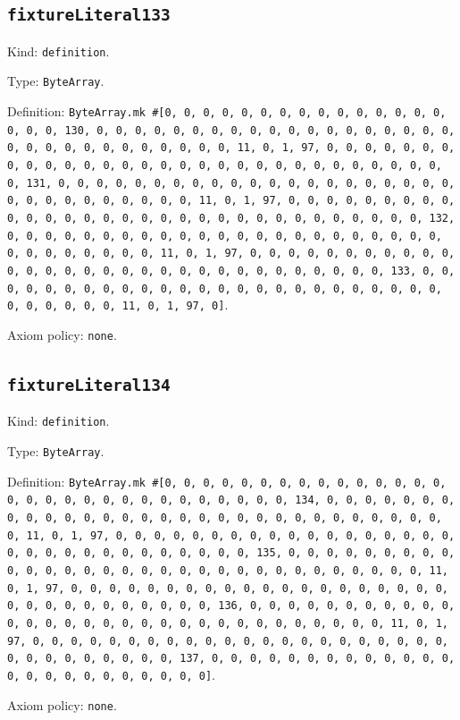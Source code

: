 \documentclass[11pt]{article}
\begin{document}
\subsection*{\texttt{fixtureLiteral133}}
\noindent Kind: \texttt{definition}.\par
\noindent Type: \texttt{ByteArray}.\par
\noindent Definition: \texttt{ByteArray.mk \#[0, 0, 0, 0, 0, 0, 0, 0, 0, 0, 0, 0, 0, 0, 0, 0, 0, 0, 130, 0, 0, 0, 0, 0, 0, 0, 0, 0, 0, 0, 0, 0, 0, 0, 0, 0, 0, 0, 0, 0, 0, 0, 0, 0, 0, 0, 0, 0, 0, 0, 11, 0, 1, 97, 0, 0, 0, 0, 0, 0, 0, 0, 0, 0, 0, 0, 0, 0, 0, 0, 0, 0, 0, 0, 0, 0, 0, 0, 0, 0, 0, 0, 0, 0, 0, 131, 0, 0, 0, 0, 0, 0, 0, 0, 0, 0, 0, 0, 0, 0, 0, 0, 0, 0, 0, 0, 0, 0, 0, 0, 0, 0, 0, 0, 0, 0, 0, 11, 0, 1, 97, 0, 0, 0, 0, 0, 0, 0, 0, 0, 0, 0, 0, 0, 0, 0, 0, 0, 0, 0, 0, 0, 0, 0, 0, 0, 0, 0, 0, 0, 0, 0, 132, 0, 0, 0, 0, 0, 0, 0, 0, 0, 0, 0, 0, 0, 0, 0, 0, 0, 0, 0, 0, 0, 0, 0, 0, 0, 0, 0, 0, 0, 0, 0, 11, 0, 1, 97, 0, 0, 0, 0, 0, 0, 0, 0, 0, 0, 0, 0, 0, 0, 0, 0, 0, 0, 0, 0, 0, 0, 0, 0, 0, 0, 0, 0, 0, 0, 0, 133, 0, 0, 0, 0, 0, 0, 0, 0, 0, 0, 0, 0, 0, 0, 0, 0, 0, 0, 0, 0, 0, 0, 0, 0, 0, 0, 0, 0, 0, 0, 0, 11, 0, 1, 97, 0]}.\par
\noindent Axiom policy: \texttt{none}.\par
\subsection*{\texttt{fixtureLiteral134}}
\noindent Kind: \texttt{definition}.\par
\noindent Type: \texttt{ByteArray}.\par
\noindent Definition: \texttt{ByteArray.mk \#[0, 0, 0, 0, 0, 0, 0, 0, 0, 0, 0, 0, 0, 0, 0, 0, 0, 0, 0, 0, 0, 0, 0, 0, 0, 0, 0, 0, 0, 0, 134, 0, 0, 0, 0, 0, 0, 0, 0, 0, 0, 0, 0, 0, 0, 0, 0, 0, 0, 0, 0, 0, 0, 0, 0, 0, 0, 0, 0, 0, 0, 0, 11, 0, 1, 97, 0, 0, 0, 0, 0, 0, 0, 0, 0, 0, 0, 0, 0, 0, 0, 0, 0, 0, 0, 0, 0, 0, 0, 0, 0, 0, 0, 0, 0, 0, 0, 135, 0, 0, 0, 0, 0, 0, 0, 0, 0, 0, 0, 0, 0, 0, 0, 0, 0, 0, 0, 0, 0, 0, 0, 0, 0, 0, 0, 0, 0, 0, 0, 11, 0, 1, 97, 0, 0, 0, 0, 0, 0, 0, 0, 0, 0, 0, 0, 0, 0, 0, 0, 0, 0, 0, 0, 0, 0, 0, 0, 0, 0, 0, 0, 0, 0, 0, 136, 0, 0, 0, 0, 0, 0, 0, 0, 0, 0, 0, 0, 0, 0, 0, 0, 0, 0, 0, 0, 0, 0, 0, 0, 0, 0, 0, 0, 0, 0, 0, 11, 0, 1, 97, 0, 0, 0, 0, 0, 0, 0, 0, 0, 0, 0, 0, 0, 0, 0, 0, 0, 0, 0, 0, 0, 0, 0, 0, 0, 0, 0, 0, 0, 0, 0, 137, 0, 0, 0, 0, 0, 0, 0, 0, 0, 0, 0, 0, 0, 0, 0, 0, 0, 0, 0, 0, 0, 0, 0, 0]}.\par
\noindent Axiom policy: \texttt{none}.\par
\end{document}
